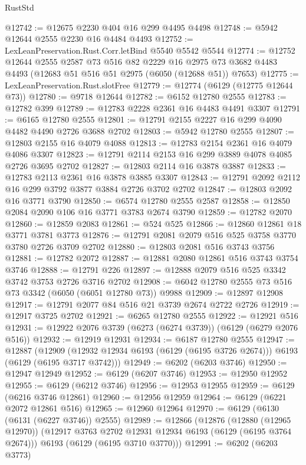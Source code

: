 \begin{lexlean}{RustStd}
\begin{coremodule}
@12742 := @12675 @2230 @404 @16 @299 @4495 @4498
@12748 := @5942 @12644 @2555 @2230 @16 @4484 @4493
@12752 := LexLeanPreservation.Rust.Corr.letBind @5540 @5542 @5544
@12774 := @12752
    @12644
    @2555
    @2587
    @73
    @516
    @82
    @2229
    @16
    @2975
    @73
    @3682
    @4483
    @4493
    (@12683 @51 @516 @51 @2975 (@6050 (@12688 @51)) @7653)
@12775 := LexLeanPreservation.Rust.slotFree
@12779 := @12774 (@6129 (@12775 @12644 @73))
@12780 := @9718 @12644
@12782 := @6152 @12780 @2555
@12783 := @12782 @399
@12789 := @12783 @2228 @2361 @16 @4483 @4491 @3307
@12791 := @6165 @12780 @2555
@12801 := @12791 @2155 @2227 @16 @299 @4090 @4482 @4490 @2726 @3688 @2702
@12803 := @5942 @12780 @2555
@12807 := @12803 @2155 @16 @4079 @4088
@12813 := @12783 @2154 @2361 @16 @4079 @4086 @3307
@12823 := @12791 @2114 @2153 @16 @299 @3889 @4078 @4085 @2726 @3695 @2702
@12827 := @12803 @2114 @16 @3878 @3887
@12833 := @12783 @2113 @2361 @16 @3878 @3885 @3307
@12843 := @12791 @2092 @2112 @16 @299 @3792 @3877 @3884 @2726 @3702 @2702
@12847 := @12803 @2092 @16 @3771 @3790
@12850 := @6574 @12780 @2555 @2587
@12858 := @12850 @2084 @2090 @106 @16 @3771 @3783 @2674 @3790
@12859 := @12782 @2070
@12860 := @12859 @2083
@12861 := @524 @525
@12866 := @12860 @12861 @18 @3771 @3781 @3773
@12876 := @12791 @2081 @2079 @516 @525 @3758 @3770 @3780 @2726 @3709 @2702
@12880 := @12803 @2081 @516 @3743 @3756
@12881 := @12782 @2072
@12887 := @12881 @2080 @12861 @516 @3743 @3754 @3746
@12888 := @12791 @226
@12897 := @12888 @2079 @516 @525 @3342 @3742 @3753 @2726 @3716 @2702
@12908 := @6042 @12780 @2555 @73 @516 @73 @3342 (@6050 (@6051 @12780 @73)) @9988
@12909 := @12897 @12908
@12917 := @12791 @2077 @84 @516 @21 @3739 @2674 @2722 @2726
@12919 := @12917 @3725 @2702
@12921 := @6265 @12780 @2555
@12922 := @12921 @516
@12931 := @12922 @2076 @3739 (@6273 (@6274 @3739)) (@6129 (@6279 @2076 @516))
@12932 := @12919 @12931
@12934 := @6187 @12780 @2555
@12947 := @12887
    (@12909 (@12932 @12934 @6193 (@6129 (@6195 @3726 @2674))) @6193 (@6129 (@6195 @3717 @3742)))
@12949 := @6202 (@6203 @3746)
@12950 := @12947 @12949
@12952 := @6129 (@6207 @3746)
@12953 := @12950 @12952
@12955 := @6129 (@6212 @3746)
@12956 := @12953 @12955
@12959 := @6129 (@6216 @3746 @12861)
@12960 := @12956 @12959
@12964 := @6129 (@6221 @2072 @12861 @516)
@12965 := @12960 @12964
@12970 := @6129 (@6130 (@6131 (@6227 @3746)) @2555)
@12989 := @12866
    (@12876
      (@12880 (@12965 @12970))
      (@12917 @3763 @2702 @12931 @12934 @6193 (@6129 (@6195 @3764 @2674)))
      @6193
      (@6129 (@6195 @3710 @3770)))
@12991 := @6202 (@6203 @3773)

\end{coremodule}
\end{lexlean}
